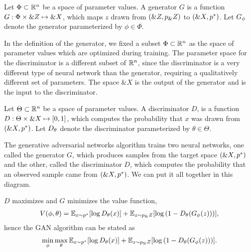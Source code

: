 \begin{definition}%
  \label{def:generator}
  Let $\Phi \subset \mathbb{R}^n$ be a space of parameter values. A
  \textnormal{\sffamily generator} $G$ is a function
  $G: \Phi \times \&Z \mapsto \&X$, which maps $z$ drawn from
  $(\&Z, p_\&Z)$ to $(\&X, p^*)$.  Let $G_\phi$ denote the generator
  parameterized by $\phi \in \Phi$.
\end{definition}

In the definition of the generator, we fixed a subset
$\Phi \subset \mathbb{R}^n$ as the space of parameter values which are
optimized during training.  The parameter space for the discriminator
is a different subset of $\mathbb{R}^n$, since the discriminator is a very
different type of neural network than the generator, requiring a
qualitatively different set of parameters.  The space $\&X$ is the
output of the generator and is the input to the discriminator.

\begin{definition}%
  \label{def:discriminator}
  Let $\Theta \subset \mathbb{R}^n$ be a space of parameter values. A
  \textnormal{\sffamily discriminator} $D$, is a function
  $D: \Theta \times \&X \mapsto [0, 1]$, which computes the
  probability that $x$ was drawn from $(\&X, p^*)$. Let
  $D_\theta$ denote the discriminator parameterized by $\theta \in \Theta$.
\end{definition}

\begin{definition}
  The \textnormal{\sffamily generative adversarial networks} algorithm
  trains two neural networks, one called the generator $G$, which
  produces samples from the target space $(\&X, p^*)$ and the other,
  called the discriminator $D$, which computes the probability that an
  observed sample came from $(\&X, p^*)$.  We can put it all together
  in this diagram.
  \begin{center}
  \end{center}
  $D$ maximizes and $G$ minimizes the value function,
  \begin{align}
    \label{eq:intro-V}
    V(\phi, \theta) = \mathbb{E}_{x \sim p^*}[{\log D_\theta(x})] +
    \mathbb{E}_{z \sim p_\&Z}[\log{(1 - D_\theta(G_\phi(z)))}],
  \end{align}
  hence the GAN algorithm can be stated as
  \begin{align}
\min_\phi\max_\theta\mathbb{E}_{x \sim p^*}[{\log D_\theta(x})] +
    \mathbb{E}_{z \sim p_\&Z}[\log{(1 - D_\theta(G_\phi(z)))}].
  \end{align}
\end{definition}


